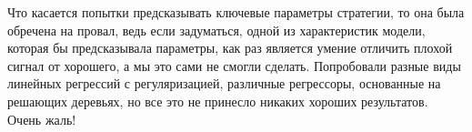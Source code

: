 Что касается попытки предсказывать ключевые параметры стратегии, то она была обречена на провал, ведь если задуматься, одной из характеристик модели, которая бы предсказывала параметры, как раз является умение отличить плохой сигнал от хорошего, а мы это сами не смогли сделать. Попробовали разные виды линейных регрессий с регуляризацией, различные регрессоры, основанные на решающих деревьях, но все это не принесло никаких хороших результатов. Очень жаль! 